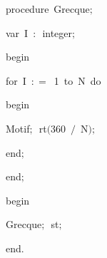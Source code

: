 {\pagebreak[3] 
\vspace{\neglskip}\mbox{\blc  \blk\idt  \mcl procedure\idt \ Grecque$;$}\par 
\pagebreak[3] 
\vspace{\neglskip}\mbox{\blc  \blk\blk\idt  \mcl var\idt \ I\ $:$\ integer$;$}\par 
\vspace{\neglskip}\mbox{\blc  \blk\idt  \mcl begin\idt }\par 
\pagebreak[3] 
\vspace{\neglskip}\mbox{\blc  \blk\blk\idt  \mcl for\idt \ I\ $:$$=$\ 1\ \mcl to\idt \ N\ \mcl do\idt }\par 
\vspace{\neglskip}\mbox{\blc  \blk\blk\blk\idt  \mcl begin\idt }\par 
\vspace{\neglskip}\mbox{\blc  \blk\blk\blk\blk\idt  Motif$;$\ rt$($360\ $/$\ N$)$$;$}\par 
\vspace{\neglskip}\mbox{\blc  \blk\blk\blk\idt  \mcl end\idt $;$}\par 
\vspace{\neglskip}\mbox{\blc  \blk\idt  \mcl end\idt $;$}\par 
\medskip

\vspace{\neglskip}\mbox{\blc  \idt  \mcl begin\idt }\par 
\vspace{\neglskip}\mbox{\blc  \blk\idt  Grecque$;$\ st$;$}\par 
\vspace{\neglskip}\mbox{\blc  \idt  \mcl end\idt $.$}\par 

\medskip }


